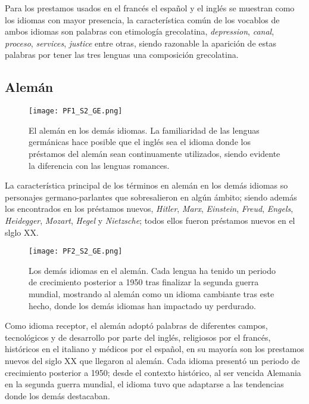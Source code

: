 Para los prestamos usados en el francés el español y el inglés se muestran como los idiomas con mayor presencia, la característica común de los vocablos de ambos idiomas  son palabras con etimología grecolatina,  \textit{depression}, \textit{canal}, \textit{proceso}, \textit{services}, \textit{justice} entre otras,  siendo razonable la aparición de estas palabras por tener las tres lenguas una composición grecolatina. 



\subsection{Alemán} %

\begin{figure}%
	\centering
	\texttt{[image: PF1\_S2\_GE.png]}
	\label{fig.ST_a_GE}
	\caption{El alemán en los demás idiomas. La familiaridad de las lenguas germánicas hace posible que el inglés sea el idioma  donde los préstamos del alemán sean continuamente utilizados, siendo evidente la diferencia con las lenguas romances.}

\end{figure}

La característica principal de los términos en alemán  en los demás idiomas  so personajes germano-parlantes que sobresalieron en algún ámbito; siendo además los encontrados en los préstamos nuevos, \textit{Hitler}, \textit{Marx}, \textit{Einstein}, \textit{Freud}, \textit{Engels}, \textit{Heidegger}, \textit{Mozart}, \textit{Hegel} y  \textit{Nietzsche}; todos ellos fueron préstamos nuevos en el slglo XX. 


\begin{figure}%
	\centering
	\texttt{[image: PF2\_S2\_GE.png]}
	\label{fig.ST_b_GE}
	\caption{Los demás idiomas en el alemán. Cada lengua ha tenido un periodo de  crecimiento posterior a 1950 tras finalizar la segunda guerra mundial, mostrando al alemán como un idioma cambiante tras este hecho, donde los demás idiomas han impactado uy perdurado.}
\end{figure}

Como idioma receptor, el alemán adoptó palabras de diferentes campos, tecnológicos y de desarrollo por parte del inglés,  religiosos  por el francés, históricos en el italiano y médicos por el español, en su mayoría son los prestamos nuevos del siglo XX que llegaron al alemán.  Cada idioma presentó un periodo de crecimiento posterior a 1950; desde el contexto histórico, al ser vencida Alemania en la segunda guerra mundial, el idioma tuvo que adaptarse a las tendencias donde los demás destacaban. 



